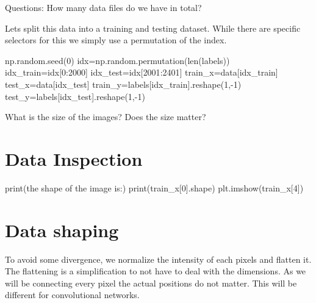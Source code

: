 \documentclass[
  letterpaper,
  DIV=11,
  numbers=noendperiod]{scrartcl}
\newenvironment{Shaded}{\begin{snugshade}}{\end{snugshade}}
\newcommand{\BuiltInTok}[1]{\textcolor[rgb]{0.00,0.23,0.31}{#1}}
\newcommand{\DecValTok}[1]{\textcolor[rgb]{0.68,0.00,0.00}{#1}}
\newcommand{\NormalTok}[1]{\textcolor[rgb]{0.00,0.23,0.31}{#1}}
\newcommand{\OperatorTok}[1]{\textcolor[rgb]{0.37,0.37,0.37}{#1}}
\newcommand{\StringTok}[1]{\textcolor[rgb]{0.13,0.47,0.30}{#1}}
\begin{document}
Questions: How many data files do we have in total?

Lets split this data into a training and testing dataset. While there
are specific selectors for this we simply use a permutation of the
index.

\begin{Shaded}
\begin{Highlighting}[]
\NormalTok{np.random.seed(}\DecValTok{0}\NormalTok{)}
\NormalTok{idx}\OperatorTok{=}\NormalTok{np.random.permutation(}\BuiltInTok{len}\NormalTok{(labels))}
\NormalTok{idx\_train}\OperatorTok{=}\NormalTok{idx[}\DecValTok{0}\NormalTok{:}\DecValTok{2000}\NormalTok{]}
\NormalTok{idx\_test}\OperatorTok{=}\NormalTok{idx[}\DecValTok{2001}\NormalTok{:}\DecValTok{2401}\NormalTok{]}
\NormalTok{train\_x}\OperatorTok{=}\NormalTok{data[idx\_train]}
\NormalTok{test\_x}\OperatorTok{=}\NormalTok{data[idx\_test]}
\NormalTok{train\_y}\OperatorTok{=}\NormalTok{labels[idx\_train].reshape(}\DecValTok{1}\NormalTok{,}\OperatorTok{{-}}\DecValTok{1}\NormalTok{)}
\NormalTok{test\_y}\OperatorTok{=}\NormalTok{labels[idx\_test].reshape(}\DecValTok{1}\NormalTok{,}\OperatorTok{{-}}\DecValTok{1}\NormalTok{)}
\end{Highlighting}
\end{Shaded}

What is the size of the images? Does the size matter?

\section{Data Inspection}\label{data-inspection}

\begin{Shaded}
\begin{Highlighting}[]
\BuiltInTok{print}\NormalTok{(}\StringTok{\textquotesingle{}the shape of the image is:\textquotesingle{}}\NormalTok{)}
\BuiltInTok{print}\NormalTok{(train\_x[}\DecValTok{0}\NormalTok{].shape)}
\NormalTok{plt.imshow(train\_x[}\DecValTok{4}\NormalTok{])}
\end{Highlighting}
\end{Shaded}

\section{Data shaping}\label{data-shaping}

To avoid some divergence, we normalize the intensity of each pixels and
flatten it. The flattening is a simplification to not have to deal with
the dimensions. As we will be connecting every pixel the actual
positions do not matter. This will be different for convolutional
networks.
\end{document}
